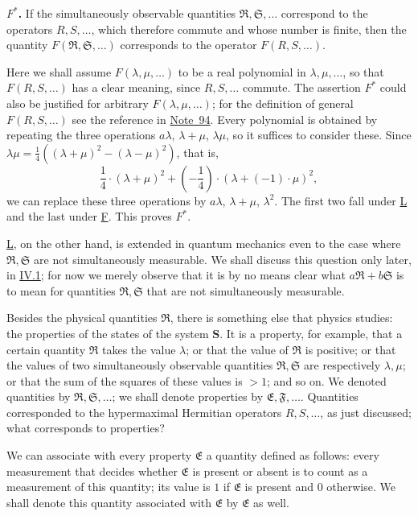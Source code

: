 \documentclass[fontsize=13pt,twoside,openany,headings=normal,parskip=false,bookmarkpackage=false,DIV=calc]{scrbook}
\begin{document}
\leavevmode{}\label{post:III.5.Fstar}\textbf{$F^*$.} If the simultaneously observable quantities $\mathfrak R,\mathfrak S,\ldots$ correspond to the operators $R,S,\ldots$, which therefore commute and whose number is finite, then the quantity $F(\mathfrak R,\mathfrak S,\ldots)$ corresponds to the operator $F(R,S,\ldots)$.

Here we shall assume $F(\lambda,\mu,\ldots)$ to be a real polynomial in $\lambda,\mu,\ldots$, so that $F(R,S,\ldots)$ has a clear meaning, since $R,S,\ldots$ commute. The assertion \hyperref[post:III.5.Fstar]{$F^*$} could also be justified for arbitrary $F(\lambda,\mu,\ldots)$; for the definition of general $F(R,S,\ldots)$ see the reference in \hyperlink{note-94}{Note~94}. Every polynomial is obtained by repeating the three operations $a\lambda$, $\lambda+\mu$, $\lambda\mu$, so it suffices to consider these. Since $\lambda\mu=\frac14((\lambda+\mu)^2-(\lambda-\mu)^2)$, that is,
\[
\frac14\cdot(\lambda+\mu)^2+\left(-\frac14\right)\cdot(\lambda+(-1)\cdot\mu)^2,
\]
we can replace these three operations by $a\lambda$, $\lambda+\mu$, $\lambda^2$. The first two fall under \hyperref[post:III.5.L]{L} and the last under \hyperref[post:III.5.F]{F}. This proves \hyperref[post:III.5.Fstar]{$F^*$}.

\hyperref[post:III.5.L]{L}, on the other hand, is extended in quantum mechanics even to the case where $\mathfrak R,\mathfrak S$ are not simultaneously measurable. We shall discuss this question only later, in \hyperref[sec:IV.1]{IV.1}; for now we merely observe that it is by no means clear what $a\mathfrak R+b\mathfrak S$ is to mean for quantities $\mathfrak R,\mathfrak S$ that are not simultaneously measurable.

Besides the physical quantities $\mathfrak R$, there is something else that physics studies: the properties of the states of the system $\boldsymbol{S}$. It is a property, for example, that a certain quantity $\mathfrak R$ takes the value $\lambda$; or that the value of $\mathfrak R$ is positive; or that the values of two simultaneously observable quantities $\mathfrak R,\mathfrak S$ are respectively $\lambda,\mu$; or that the sum of the squares of these values is $>1$; and so on. We denoted quantities by $\mathfrak R,\mathfrak S,\ldots$; we shall denote properties by $\mathfrak E,\mathfrak F,\ldots$. Quantities corresponded to the hypermaximal Hermitian operators $R,S,\ldots$, as just discussed; what corresponds to properties?

We can associate with every property $\mathfrak E$ a quantity defined as follows: every measurement that decides whether $\mathfrak E$ is present or absent is to count as a measurement of this quantity; its value is $1$ if $\mathfrak E$ is present and $0$ otherwise. We shall denote this quantity associated with $\mathfrak E$ by $\mathfrak E$ as well.
\end{document}
